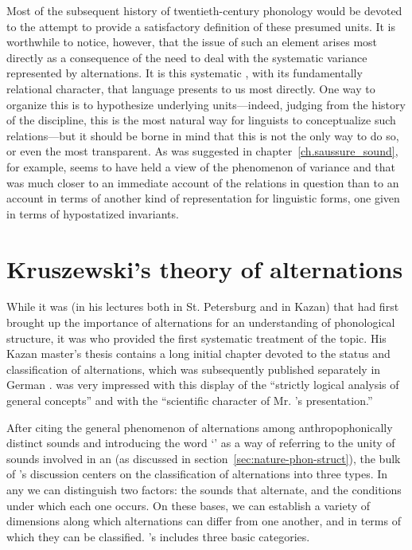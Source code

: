 Most of the subsequent history of twentieth-century phonology would be
devoted to the attempt to provide a satisfactory definition of these
presumed  units. It is worthwhile to notice, however, that
the issue of such an  element arises most directly as a
consequence of the need to deal with the systematic variance
represented by alternations. It is this systematic , with its
fundamentally relational character, that language presents to us most
directly. One way to organize this  is to hypothesize
underlying  units—indeed, judging from the history of the
discipline, this is the most natural way for linguists to
conceptualize such relations—but it should be borne in mind that this
is not the only way to do so, or even the most transparent. As was
suggested in chapter~\ref{ch.saussure_sound}, for example, {\Saussure}
seems to have held a view of the phenomenon of variance and
 that was much closer to an immediate account of the
relations in question than to an account in terms of another kind of
representation for linguistic forms, one given in terms of
hypostatized invariants.

\section{Kruszewski's theory of alternations}

While it was {\Baudouin} (in his lectures both in St. Petersburg and in
Kazan) that had first brought up the importance of alternations for an
understanding of phonological structure, it was {\Kruszewski} who
provided the first systematic treatment of the topic. His Kazan
master's thesis contains a long initial chapter devoted to the status
and classification of alternations, which was subsequently published
separately in {German} \citep{kruszewski81:alternation}. {\Baudouin} was
very impressed with this display of the ``strictly logical analysis of
general concepts'' and with the ``scientific character of
Mr. {\Kruszewski}'s presentation.''

After citing the general phenomenon of alternations among
anthropophonically distinct sounds and introducing the word `'
as a way of referring to the unity of sounds involved in an
 (as discussed in section~\ref{sec:nature-phon-struct}),
the bulk of {\Kruszewski}'s discussion centers on the classification of
alternations into three types. In any  we can distinguish
two factors: the sounds that alternate, and the conditions under which
each one occurs. On these bases, we can establish a variety of
dimensions along which alternations can differ from one another, and
in terms of which they can be classified. {\Kruszewski}'s 
includes three basic categories.

